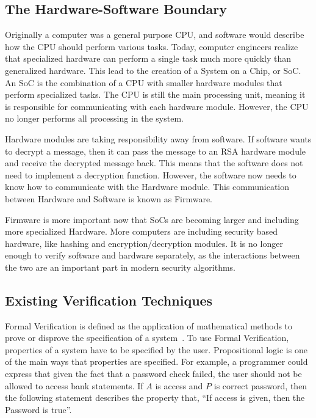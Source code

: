 \documentclass[../report.tex]{subfiles}
\begin{document}
\subsection{The Hardware-Software Boundary}

Originally a computer was a general purpose CPU, and software would
describe how the CPU should perform various tasks.
Today, computer engineers realize that specialized hardware can perform a single
task much more quickly than generalized hardware.
This lead to the creation of a System on a Chip, or SoC. An SoC is the
combination of a CPU with smaller hardware modules that perform specialized
tasks.
The CPU is still the main processing unit, meaning it is responsible for
communicating with each hardware module.
However, the CPU no longer performs all processing in the system.

Hardware modules are taking responsibility away from software.
If software wants to decrypt a message, then it can pass the message to an RSA
hardware module and receive the decrypted message back.
This means that the software does not need to implement a decryption function.
However, the software now needs to know how to communicate with the Hardware
module. This communication between Hardware and Software is known as Firmware.

Firmware is more important now that SoCs are becoming larger and including more
specialized Hardware. 
More computers are including security based hardware, like hashing and encryption/decryption modules.
It is no longer enough to verify software and hardware separately, as the
interactions between the two are an important part in modern security
algorithms.

\subsection{Existing Verification Techniques}

Formal Verification is defined as the application of mathematical methods to
prove or disprove the specification of a system~\cite{greenstreet}.
To use Formal Verification, properties of a system have to be specified by the
user. 
Propositional logic is one of the main ways that properties are specified.
For example, a programmer could express that given the fact that a password
check failed, the user should not be allowed to access bank statements.
If $A$ is access and $P$ is correct password, then the following statement
describes the property that, ``If access is given, then the Password is true''.
\end{document}

